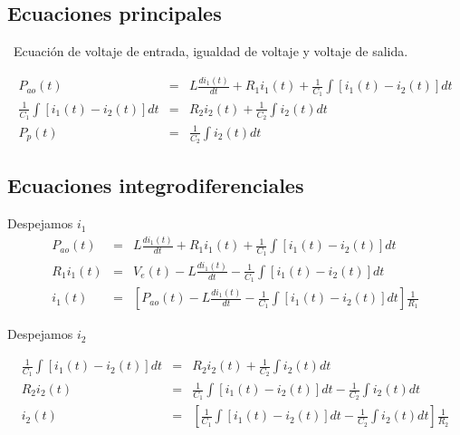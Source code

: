 \documentclass[letterpaper,11pt]{article}
\begin{document}
\subsection{Ecuaciones principales}

\bigskip\ Ecuaci\'{o}n de voltaje de entrada, igualdad de voltaje y voltaje
de salida.

\begin{eqnarray*}
P_{ao}\left( t\right) &=&L\frac{di_{1}\left( t\right) }{dt}+R_{1}i_{1}\left(
t\right) +\frac{1}{C_{1}}\int \left[ i_{1}\left( t\right) -i_{2}\left(
t\right) \right] dt \\
\frac{1}{C_{1}}\int \left[ i_{1}\left( t\right) -i_{2}\left( t\right) \right]
dt &=&R_{2}i_{2}\left( t\right) +\frac{1}{C_{2}}\int i_{2}\left( t\right) dt
\\
P_{p}\left( t\right) &=&\frac{1}{C_{2}}\int i_{2}\left( t\right) dt
\end{eqnarray*}

\subsection{Ecuaciones integrodiferenciales}

\bigskip Despejamos $i_{1}$ 
\begin{eqnarray*}
P_{ao}\left( t\right) &=&L\frac{di_{1}\left( t\right) }{dt}+R_{1}i_{1}\left(
t\right) +\frac{1}{C_{1}}\int \left[ i_{1}\left( t\right) -i_{2}\left(
t\right) \right] dt \\
R_{1}i_{1}\left( t\right) &=&V_{e}\left( t\right) -L\frac{di_{1}\left(
t\right) }{dt}-\frac{1}{C_{1}}\int \left[ i_{1}\left( t\right) -i_{2}\left(
t\right) \right] dt \\
i_{1}\left( t\right) &=&\left[ P_{ao}\left( t\right) -L\frac{di_{1}\left(
t\right) }{dt}-\frac{1}{C_{1}}\int \left[ i_{1}\left( t\right) -i_{2}\left(
t\right) \right] dt\right] \frac{1}{R_{1}}
\end{eqnarray*}

\bigskip \bigskip Despejamos $i_{2}$

\begin{eqnarray*}
\frac{1}{C_{1}}\int \left[ i_{1}\left( t\right) -i_{2}\left( t\right) \right]
dt &=&R_{2}i_{2}\left( t\right) +\frac{1}{C_{2}}\int i_{2}\left( t\right) dt
\\
R_{2}i_{2}\left( t\right) &=&\frac{1}{C_{1}}\int \left[ i_{1}\left( t\right)
-i_{2}\left( t\right) \right] dt-\frac{1}{C_{2}}\int i_{2}\left( t\right) dt
\\
i_{2}\left( t\right) &=&\left[ \frac{1}{C_{1}}\int \left[ i_{1}\left(
t\right) -i_{2}\left( t\right) \right] dt-\frac{1}{C_{2}}\int i_{2}\left(
t\right) dt\right] \frac{1}{R_{2}}
\end{eqnarray*}
\end{document}
